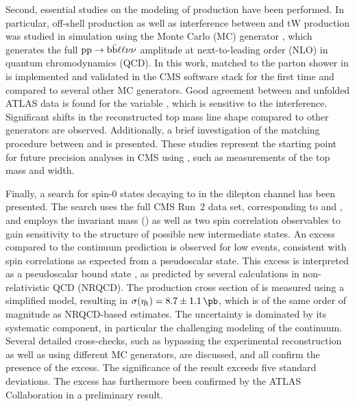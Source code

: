 Second, essential studies on the modeling of \ttbar production have been performed. In particular, off-shell \ttbar production as well as interference between \ttbar and tW production was studied in simulation using the Monte Carlo (MC) generator \bbfourl, which generates the full $\mathrm{pp} \rightarrow \mathrm{b \bar{b}} \ell \ell \nu \nu$ amplitude at next-to-leading order (NLO) in quantum chromodynamics (QCD). %
In this work, \bbfourl matched to the parton shower in \pythia is implemented and validated in the CMS software stack for the first time and compared to several other \ttbar MC generators. Good agreement between \bbfourl and unfolded ATLAS data is found for the variable \mblminimax, which is sensitive to the \tttW interference. Significant shifts in the reconstructed top mass line shape compared to other generators are observed. Additionally, a brief investigation of the matching procedure between \bbfourl and \pythia is presented. These studies represent the starting point for future precision \ttbar analyses in CMS using \bbfourl, such as measurements of the top mass and width.


\smallskip

Finally, a search for spin-0 states decaying to \ttbar in the dilepton channel has been presented. The search uses the full CMS Run~2 data set, corresponding to \lumiRII and \sqrtsRII, and employs the invariant \ttbar mass (\mtt) as well as two \ttbar spin correlation observables to gain sensitivity to the \CP structure of possible new intermediate states. An excess compared to the \ttbar continuum prediction is observed for low \mtt events, consistent with spin correlations as expected from a pseudoscalar state. This excess is interpreted as a pseudoscalar \ttbar bound state \etat, as predicted by several calculations in non-relativistic QCD (NRQCD). The production cross section of \etat is measured using a simplified \etat model, resulting in $\sigetat = 8.7 \pm 1.1  \, \si{\pb}$, which is of the same order of magnitude as NRQCD-based estimates. The uncertainty is dominated by its systematic component, in particular the challenging modeling of the \ttbar continuum. Several detailed cross-checks, such as bypassing the experimental \ttbar reconstruction as well as using different MC generators, are discussed, and all confirm the presence of the excess. The significance of the result exceeds five standard deviations. 
The excess has furthermore been confirmed by the ATLAS Collaboration in a preliminary result.

